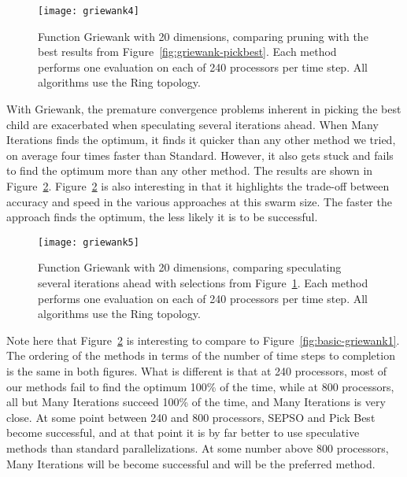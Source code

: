 \documentclass[ms,electronic,twosidetoc,letterpaper,chaptercenter,parttop,equalmargins]{byumsphd}
\newcommand{\fig}[1]{Figure~\ref{fig:#1}}
\begin{document}
\begin{figure}
  \centering
  \texttt{[image: griewank4]}
  \caption{Function Griewank with 20 dimensions, comparing pruning with the
  best results from \fig{griewank-pickbest}.  Each method performs one
  evaluation on each of 240 processors per time step.  All algorithms use the
  Ring topology.}
  \label{fig:griewank-pruned}
\end{figure}

With Griewank, the premature convergence problems inherent in picking the best
child are exacerbated when speculating several iterations ahead.  When Many
Iterations finds the optimum, it finds it quicker than any other method we
tried, on average four times faster than Standard.  However, it also gets stuck
and fails to find the optimum more than any other method.  The results are
shown in \fig{griewank-manyiters}.   \fig{griewank-manyiters} is also
interesting in that it highlights the trade-off between accuracy and speed in
the various approaches at this swarm size.  The faster the approach finds the
optimum, the less likely it is to be successful.

\begin{figure}
  \centering
  \texttt{[image: griewank5]}
  \caption{Function Griewank with 20 dimensions, comparing speculating several
  iterations ahead with selections from \fig{griewank-pruned}.  Each method
  performs one evaluation on each of 240 processors per time step.  All
  algorithms use the Ring topology.}
  \label{fig:griewank-manyiters}
\end{figure}

Note here that \fig{griewank-manyiters} is interesting to compare to
\fig{basic-griewank1}.  The ordering of the methods in terms of the number of
time steps to completion is the same in both figures.  What is different is
that at 240 processors, most of our methods fail to find the optimum 100\% of
the time, while at 800 processors, all but Many Iterations succeed 100\% of the
time, and Many Iterations is very close.  At some point between 240 and 800
processors, SEPSO and Pick Best become successful, and at that point it is by
far better to use speculative methods than standard parallelizations.  At some
number above 800 processors, Many Iterations will be become successful and will
be the preferred method.
\end{document}
